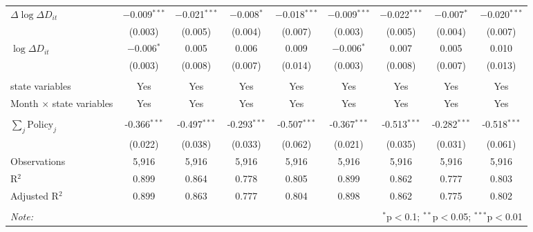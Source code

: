 \begin{tabular}{@{\extracolsep{1pt}}lcccccccc}
  $\Delta \log \Delta D_{it}$ & $-$0.009$^{***}$ & $-$0.021$^{***}$ & $-$0.008$^{*}$ & $-$0.018$^{***}$ & $-$0.009$^{***}$ & $-$0.022$^{***}$ & $-$0.007$^{*}$ & $-$0.020$^{***}$ \\ 
  & (0.003) & (0.005) & (0.004) & (0.007) & (0.003) & (0.005) & (0.004) & (0.007) \\ 
  $\log \Delta D_{it}$ & $-$0.006$^{*}$ & 0.005 & 0.006 & 0.009 & $-$0.006$^{*}$ & 0.007 & 0.005 & 0.010 \\ 
  & (0.003) & (0.008) & (0.007) & (0.014) & (0.003) & (0.008) & (0.007) & (0.013) \\ 
 \hline \\[-1.8ex] 
state variables & Yes & Yes & Yes & Yes & Yes & Yes & Yes & Yes \\ 
Month $\times$ state variables & Yes & Yes & Yes & Yes & Yes & Yes & Yes & Yes \\ 
\hline \\[-1.8ex] 
$\sum_j \mathrm{Policy}_j$ & -0.366$^{***}$ & -0.497$^{***}$ & -0.293$^{***}$ & -0.507$^{***}$ & -0.367$^{***}$ & -0.513$^{***}$ & -0.282$^{***}$ & -0.518$^{***}$ \\ 
 & (0.022) & (0.038) & (0.033) & (0.062) & (0.021) & (0.035) & (0.031) & (0.061) \\ 
Observations & 5,916 & 5,916 & 5,916 & 5,916 & 5,916 & 5,916 & 5,916 & 5,916 \\ 
R$^{2}$ & 0.899 & 0.864 & 0.778 & 0.805 & 0.899 & 0.862 & 0.777 & 0.803 \\ 
Adjusted R$^{2}$ & 0.899 & 0.863 & 0.777 & 0.804 & 0.898 & 0.862 & 0.775 & 0.802 \\ 
\hline 
\hline \\[-1.8ex] 
\textit{Note:}  & \multicolumn{8}{r}{$^{*}$p$<$0.1; $^{**}$p$<$0.05; $^{***}$p$<$0.01} \\ 
\end{tabular} 